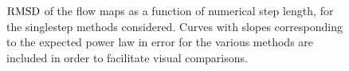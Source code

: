 \begin{figure}[htpb]
    \centering
    
    \caption[$\rmsd$ of the flow maps as a function of numerical step length,
    for the singlestep methods considered]{$\rmsd$ of the flow maps as a
    function of numerical step length, for the singlestep methods considered.
    Curves with slopes corresponding to the expected power law in error for the
    various methods are included in order to facilitate visual comparisons.}
    \label{fig:flowmap_err_fixed}
\end{figure}
